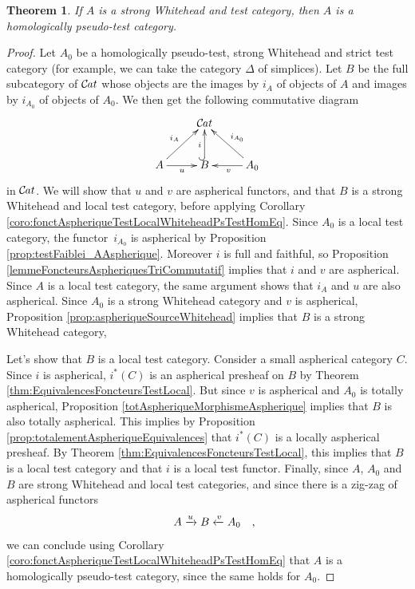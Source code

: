 \documentclass[10pt,a4paper]{amsart}
\newtheorem{theorem}{Theorem}
\newcommand{\Cat}{{\mathcal{C}\mspace{-2.mu}\it{at}}}
\newcommand\pbox[1]{\zbox{\quad #1}} %
\newcommand\zbox[1]{\makebox[0pt][l]{#1}}
\begin{document}
\begin{theorem}\label{thm:WhiteheadTestHomPseudoTest}
If $A$ is a strong Whitehead and test category, then $A$ is a
homologically pseudo-test category.
\end{theorem}

\begin{proof}
Let $A_0$ be a homologically pseudo-test, strong Whitehead and
strict test category (for example, we can take the category $\Delta$
of simplices). Let $B$ be the full subcategory of $\Cat$ whose objects
are the images by $i_A$ of objects of $A$ and images by $i_{A_0}$ of
objects of $A_0$. We then get the following commutative diagram
\[
\xymatrix{
& \Cat 
\\
A \ar[r]_{u} \ar[ru]^{i_A} &
B \ar@{^{(}->}[u]^{i} &
A_0 \ar[l]^{v} \ar[lu]_{i_{A_0}} 
} 
\]
in $\Cat$. We will show that $u$ and $v$ are aspherical functors, and
that $B$ is a strong Whitehead and local test category, before applying
Corollary \ref{coro:fonctAspheriqueTestLocalWhiteheadPsTestHomEq}.
Since $A_0$ is a local test category, the functor~$i_{A_0}$ is
aspherical by Proposition \ref{prop:testFaiblei_AAspherique}.
Moreover $i$ is full and faithful, so Proposition
\ref{lemmeFoncteursAspheriquesTriCommutatif} implies that $i$ and $v$ are
aspherical. Since $A$ is a local test category, the same argument shows that
$i_A$ and $u$ are also aspherical. Since $A_0$ is a strong Whitehead category
and $v$ is aspherical, Proposition \ref{prop:aspheriqueSourceWhitehead} implies
that $B$ is a strong Whitehead
category,

Let's show that $B$ is a local test category. 
Consider a small aspherical category $C$. Since $i$ is aspherical,
$i^*(C)$ is an aspherical presheaf on $B$ by Theorem
\ref{thm:EquivalencesFoncteursTestLocal}. But since $v$ is aspherical and $A_0$
is totally aspherical,
Proposition \ref{totAspheriqueMorphismeAspherique} implies that $B$ is also
totally aspherical. This implies by Proposition
\ref{prop:totalementAspheriqueEquivalences} that $i^*(C)$ is a locally
aspherical presheaf. By Theorem
\ref{thm:EquivalencesFoncteursTestLocal}, this implies that $B$ is a
local test category and that $i$ is a local test functor.
Finally, since $A$, $A_0$ and $B$ are strong Whitehead and local test
categories, and since there is a zig-zag of aspherical functors
\[
A \xrightarrow{u} B \xleftarrow{v} A_0 \pbox{,}
\]
we can conclude using Corollary
\ref{coro:fonctAspheriqueTestLocalWhiteheadPsTestHomEq} that $A$ is a
homologically pseudo-test category, since the same holds for
$A_0$.
\end{proof}
\end{document}
